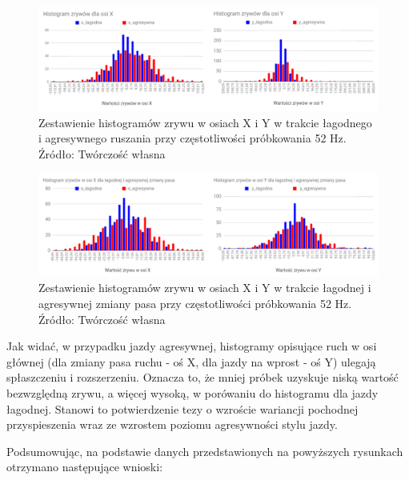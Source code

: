 \begin{figure}[H]
	\centering
	\includegraphics[width=16cm]{img/driving_analysis/histogram_zestawienie_ostre_lagodne_ruszanie.png}
	\caption{Zestawienie histogramów zrywu w osiach X i Y w trakcie łagodnego i agresywnego ruszania przy częstotliwości próbkowania 52 Hz.
	\\Źródło: Twórczość własna}
	\label{fig:image_histogram_acceleration_52Hz}
\end{figure}

\begin{figure}[H]
	\centering
	\includegraphics[width=16cm]{img/driving_analysis/histogram_zestawienie_zmiana_pasa.png}
	\caption{Zestawienie histogramów zrywu w osiach X i Y w trakcie łagodnej i agresywnej zmiany pasa przy częstotliwości próbkowania 52 Hz.
	\\Źródło: Twórczość własna}
	\label{fig:image_histogram_changing_lane_52Hz}
\end{figure}

Jak widać, w przypadku jazdy agresywnej, histogramy opisujące ruch w osi głównej (dla zmiany pasa ruchu - oś X, dla jazdy na wprost - oś Y) ulegają spłaszczeniu i rozszerzeniu. Oznacza to, że mniej próbek uzyskuje niską wartość bezwzględną zrywu, a więcej wysoką, w porówaniu do histogramu dla jazdy łagodnej. Stanowi to potwierdzenie tezy o wzroście wariancji pochodnej przyspieszenia wraz ze wzrostem poziomu agresywności stylu jazdy.

Podsumowując, na podstawie danych przedstawionych na powyższych rysunkach otrzymano następujące wnioski:

